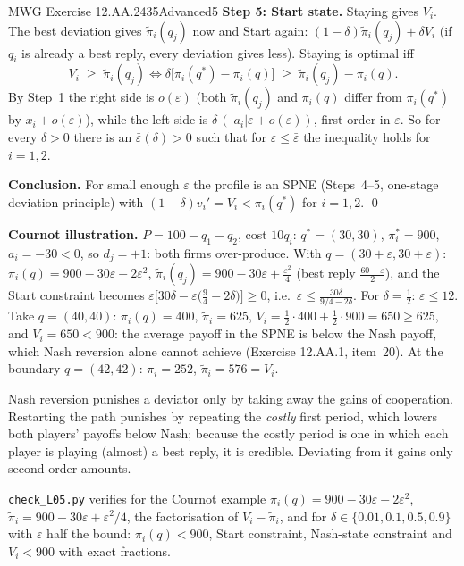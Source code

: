 \begin{exsol}{MWG Exercise 12.AA.2}{435}{Advanced}{5}
\textbf{Step 5: Start state.} Staying gives $V_i$. The best deviation gives $\tilde\pi_i(q_j)$ now and Start again:
$(1-\delta)\tilde\pi_i(q_j) + \delta V_i$ (if $q_i$ is already a best reply, every deviation gives less). Staying is optimal iff
\[
  V_i \;\ge\; \tilde\pi_i(q_j)
  \iff \delta\bigl[\pi_i(q^*) - \pi_i(q)\bigr] \;\ge\; \tilde\pi_i(q_j) - \pi_i(q) .
\]
By Step~1 the right side is $o(\varepsilon)$ (both $\tilde\pi_i(q_j)$ and $\pi_i(q)$ differ from $\pi_i(q^*)$ by $x_i + o(\varepsilon)$), while the left side is
$\delta\,(|a_i|\varepsilon + o(\varepsilon))$, first order in $\varepsilon$. So for every $\delta > 0$ there is an $\bar\varepsilon(\delta) > 0$ such that for
$\varepsilon \le \bar\varepsilon$ the inequality holds for $i = 1, 2$.

\textbf{Conclusion.} For small enough $\varepsilon$ the profile is an SPNE (Steps~4--5, one-stage deviation principle) with
$(1-\delta)v_i' = V_i < \pi_i(q^*)$ for $i=1,2$. \qed

\textbf{Cournot illustration.} $P = 100 - q_1 - q_2$, cost $10q_i$: $q^* = (30,30)$, $\pi_i^* = 900$, $a_i = -30 < 0$, so $d_j = +1$: both
firms over-produce. With $q = (30 + \varepsilon, 30 + \varepsilon)$: $\pi_i(q) = 900 - 30\varepsilon - 2\varepsilon^2$,
$\tilde\pi_i(q_j) = 900 - 30\varepsilon + \frac{\varepsilon^2}{4}$ (best reply $\frac{60 - \varepsilon}{2}$), and the Start constraint
becomes $\varepsilon\bigl[30\delta - \varepsilon\bigl(\frac94 - 2\delta\bigr)\bigr] \ge 0$, i.e.\
$\varepsilon \le \frac{30\delta}{9/4 - 2\delta}$. For $\delta = \frac12$: $\varepsilon \le 12$. Take $q = (40,40)$:
$\pi_i(q) = 400$, $\tilde\pi_i = 625$, $V_i = \frac12\cdot400 + \frac12\cdot900 = 650 \ge 625$, and $V_i = 650 < 900$: the
average payoff in the SPNE is below the Nash payoff, which Nash reversion alone cannot achieve (Exercise 12.AA.1, item~20). At the boundary $q = (42,42)$:
$\pi_i = 252$, $\tilde\pi_i = 576 = V_i$.

\interp Nash reversion punishes a deviator only by taking away the gains of cooperation. Restarting the path
punishes by repeating the \emph{costly} first period, which lowers both players' payoffs below Nash; because the
costly period is one in which each player is playing (almost) a best reply, it is credible. Deviating from it gains only
second-order amounts.

\verify \texttt{check\_L05.py} verifies for the Cournot example $\pi_i(q) = 900 - 30\varepsilon - 2\varepsilon^2$,
$\tilde\pi_i = 900 - 30\varepsilon + \varepsilon^2/4$, the factorisation of $V_i - \tilde\pi_i$, and for $\delta \in \{0.01, 0.1, 0.5, 0.9\}$ with $\varepsilon$
half the bound: $\pi_i(q) < 900$, Start constraint, Nash-state constraint and $V_i < 900$ with exact fractions.


\end{exsol}
